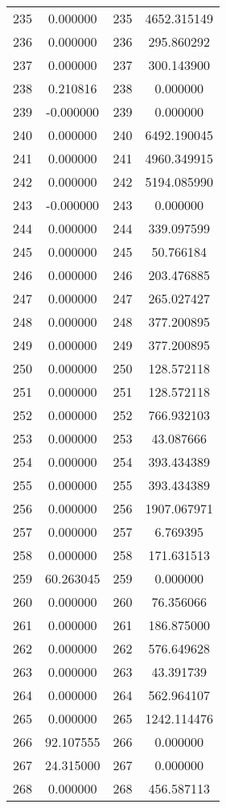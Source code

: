 \documentclass[12pt]{article}
\begin{document}
\begin{longtable}{@{}cccc@{}}
235 & 0.000000 & 235 & 4652.315149 \\
236 & 0.000000 & 236 & 295.860292 \\
237 & 0.000000 & 237 & 300.143900 \\
238 & 0.210816 & 238 & 0.000000 \\
239 & -0.000000 & 239 & 0.000000 \\
240 & 0.000000 & 240 & 6492.190045 \\
241 & 0.000000 & 241 & 4960.349915 \\
242 & 0.000000 & 242 & 5194.085990 \\
243 & -0.000000 & 243 & 0.000000 \\
244 & 0.000000 & 244 & 339.097599 \\
245 & 0.000000 & 245 & 50.766184 \\
246 & 0.000000 & 246 & 203.476885 \\
247 & 0.000000 & 247 & 265.027427 \\
248 & 0.000000 & 248 & 377.200895 \\
249 & 0.000000 & 249 & 377.200895 \\
250 & 0.000000 & 250 & 128.572118 \\
251 & 0.000000 & 251 & 128.572118 \\
252 & 0.000000 & 252 & 766.932103 \\
253 & 0.000000 & 253 & 43.087666 \\
254 & 0.000000 & 254 & 393.434389 \\
255 & 0.000000 & 255 & 393.434389 \\
256 & 0.000000 & 256 & 1907.067971 \\
257 & 0.000000 & 257 & 6.769395 \\
258 & 0.000000 & 258 & 171.631513 \\
259 & 60.263045 & 259 & 0.000000 \\
260 & 0.000000 & 260 & 76.356066 \\
261 & 0.000000 & 261 & 186.875000 \\
262 & 0.000000 & 262 & 576.649628 \\
263 & 0.000000 & 263 & 43.391739 \\
264 & 0.000000 & 264 & 562.964107 \\
265 & 0.000000 & 265 & 1242.114476 \\
266 & 92.107555 & 266 & 0.000000 \\
267 & 24.315000 & 267 & 0.000000 \\
268 & 0.000000 & 268 & 456.587113 \\

\end{longtable}
\end{document}
